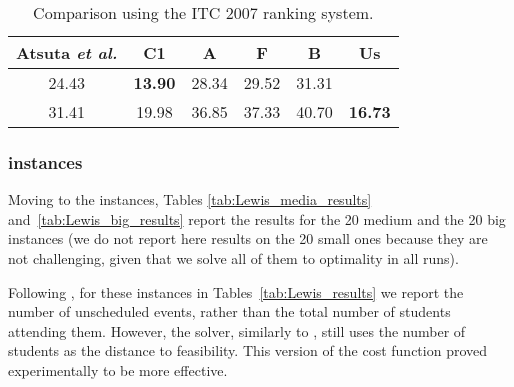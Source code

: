 \documentclass[authoryear,preprint,a4paper,12pt]{elsarticle}
\begin{document}
\begin{table}[htdp]
\begin{center}
\begin{footnotesize}
\begin{tabular}{|c|c|c|c|c|c|}
\hline
Atsuta \emph{et al.} & C1 & A & F & B & Us \\ \hline
24.43 & \textbf{13.90} & 28.34 & 29.52 & 31.31 & \\ \hline
31.41 & 19.98 & 36.85 & 37.33 & 40.70 & \textbf{16.73} \\ \hline
\end{tabular}
\end{footnotesize}
\end{center}
\caption{Comparison using the ITC 2007 ranking system.}
\label{tab:rankITC2007}
\end{table}

\subsubsection{\citeauthor{LePa05} instances}

Moving to the \citeauthor{LePa05} instances, Tables
\ref{tab:Lewis_media_results} and~\ref{tab:Lewis_big_results} report
the results for the 20 medium and the 20 big instances (we do not
report here results on the 20 small ones because they are not
challenging, given that we solve all of them to optimality in all
runs). 

Following \citet{LePa07}, for these instances in
Tables~\ref{tab:Lewis_results} we report the number of unscheduled
events, rather than the total number of students attending them.
However, the solver, similarly to \citet{TuBM07}, still uses the
number of students as the distance to feasibility. This version of the
cost function proved experimentally to be more effective.
\end{document}
